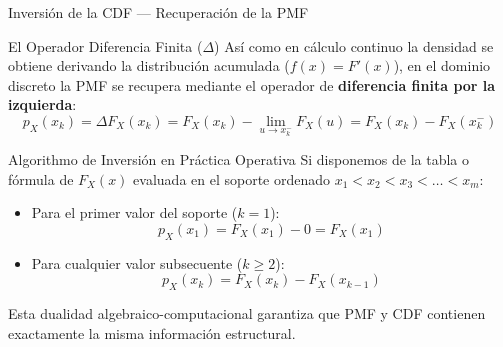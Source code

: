 \documentclass[10pt, aspectratio=169]{beamer}
\begin{document}
\begin{frame}{Inversión de la CDF — Recuperación de la PMF}
  \fontsize{7.5pt}{9pt}\selectfont
  \begin{block}{El Operador Diferencia Finita ($\Delta$)}
    \fontsize{7.5pt}{9pt}\selectfont
    Así como en cálculo continuo la densidad se obtiene derivando la distribución acumulada ($f(x) = F'(x)$), en el dominio discreto la PMF se recupera mediante el operador de \textbf{diferencia finita por la izquierda}:
    $$p_X(x_k) = \Delta F_X(x_k) = F_X(x_k) - \lim_{u \to x_k^-} F_X(u) = F_X(x_k) - F_X(x_{k}^-)$$
  \end{block}
  \vspace{-0.15cm}
  \pause
  \begin{alertblock}{Algorithmo de Inversión en Práctica Operativa}
    \fontsize{7.5pt}{9pt}\selectfont
    Si disponemos de la tabla o fórmula de $F_X(x)$ evaluada en el soporte ordenado $x_1 < x_2 < x_3 < \dots < x_m$:
    \begin{itemize}\itemsep=0.08cm
      \item Para el primer valor del soporte ($k=1$):
      $$p_X(x_1) = F_X(x_1) - 0 = F_X(x_1)$$
      \item Para cualquier valor subsecuente ($k \ge 2$):
      $$p_X(x_k) = F_X(x_k) - F_X(x_{k-1})$$
    \end{itemize}
    Esta dualidad algebraico-computacional garantiza que PMF y CDF contienen exactamente la misma información estructural.
  \end{alertblock}
\end{frame}
\end{document}
